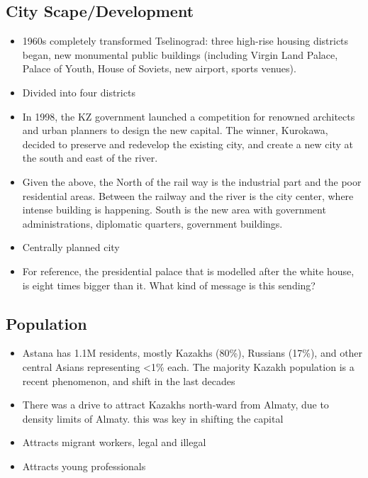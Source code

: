 \documentclass[11pt]{article}
\begin{document}
\subsection{City Scape/Development}

\begin{itemize}
  \item 1960s completely transformed Tselinograd: three high-rise housing districts began, new monumental public buildings (including Virgin Land Palace, Palace of Youth, House of Soviets, new airport, sports venues).
  \item Divided into four districts
  \item In 1998, the KZ government launched a competition for renowned architects and urban planners to design the new capital. The winner, Kurokawa, decided to preserve and redevelop the existing city, and create a new city at the south and east of the river. 
  \item Given the above, the North of the rail way is the industrial part and the poor residential areas. Between the railway and the river is the city center, where intense building is happening. South is the new area with government administrations, diplomatic quarters, government buildings.
  \item Centrally planned city
  \item For reference, the presidential palace that is modelled after the white house, is eight times bigger than it. What kind of message is this sending? 
\end{itemize}

\subsection{Population}

\begin{itemize}
  \item Astana has 1.1M residents, mostly Kazakhs (80\%), Russians (17\%), and other central Asians representing <1\% each. The majority Kazakh population is a recent phenomenon, and shift in the last decades
  \item There was a drive to attract Kazakhs north-ward from Almaty, due to density limits of Almaty. this was key in shifting the capital
  \item Attracts migrant workers, legal and illegal
  \item Attracts young professionals
\end{itemize}
\end{document}
